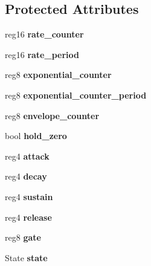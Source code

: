 \subsection*{Protected Attributes}
\begin{DoxyCompactItemize}
\item 
\hypertarget{classEnvelopeGenerator_a1174e571e81e932651a4d8879e3d4c06}{reg16 {\bfseries rate\-\_\-counter}}\label{classEnvelopeGenerator_a1174e571e81e932651a4d8879e3d4c06}

\item 
\hypertarget{classEnvelopeGenerator_a808f2c86e6190a92d185ec92ba3082bb}{reg16 {\bfseries rate\-\_\-period}}\label{classEnvelopeGenerator_a808f2c86e6190a92d185ec92ba3082bb}

\item 
\hypertarget{classEnvelopeGenerator_af80f10348405747edc02ac9fa98ca0c6}{reg8 {\bfseries exponential\-\_\-counter}}\label{classEnvelopeGenerator_af80f10348405747edc02ac9fa98ca0c6}

\item 
\hypertarget{classEnvelopeGenerator_a3b69fccd0060cf276d292e8146fce477}{reg8 {\bfseries exponential\-\_\-counter\-\_\-period}}\label{classEnvelopeGenerator_a3b69fccd0060cf276d292e8146fce477}

\item 
\hypertarget{classEnvelopeGenerator_a464e4a37977dc1cba2ac2c2e0ab08dc5}{reg8 {\bfseries envelope\-\_\-counter}}\label{classEnvelopeGenerator_a464e4a37977dc1cba2ac2c2e0ab08dc5}

\item 
\hypertarget{classEnvelopeGenerator_aa0d69acef90f7b774ff310867abf303a}{bool {\bfseries hold\-\_\-zero}}\label{classEnvelopeGenerator_aa0d69acef90f7b774ff310867abf303a}

\item 
\hypertarget{classEnvelopeGenerator_ac9f0841261fbaebc81bec8c44d620efc}{reg4 {\bfseries attack}}\label{classEnvelopeGenerator_ac9f0841261fbaebc81bec8c44d620efc}

\item 
\hypertarget{classEnvelopeGenerator_a2358e25140510b053be819b7e30fe7c9}{reg4 {\bfseries decay}}\label{classEnvelopeGenerator_a2358e25140510b053be819b7e30fe7c9}

\item 
\hypertarget{classEnvelopeGenerator_ad20c416194325779cb19e6793d292bc3}{reg4 {\bfseries sustain}}\label{classEnvelopeGenerator_ad20c416194325779cb19e6793d292bc3}

\item 
\hypertarget{classEnvelopeGenerator_affb4071ce3cb5641d06789770e813c66}{reg4 {\bfseries release}}\label{classEnvelopeGenerator_affb4071ce3cb5641d06789770e813c66}

\item 
\hypertarget{classEnvelopeGenerator_a6d846838ae52984fbad4f5dacf1edee8}{reg8 {\bfseries gate}}\label{classEnvelopeGenerator_a6d846838ae52984fbad4f5dacf1edee8}

\item 
\hypertarget{classEnvelopeGenerator_a1330b888e7db119e687761699b460f69}{State {\bfseries state}}\label{classEnvelopeGenerator_a1330b888e7db119e687761699b460f69}

\end{DoxyCompactItemize}
